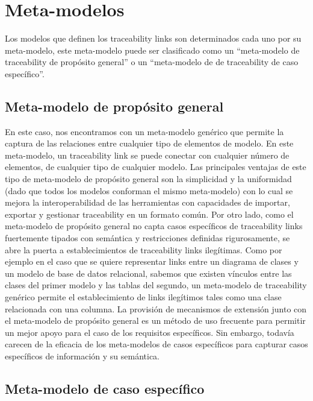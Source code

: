 \documentclass[a4paper,12pt,oneside]{book}
\begin{document}
\section{Meta-modelos}

Los modelos que definen los traceability links son determinados cada uno por su meta-modelo, este meta-modelo puede ser clasificado como un “meta-modelo de traceability de propósito general” o un “meta-modelo de de traceability de caso específico”.

\subsection{Meta-modelo de propósito general}

En este caso, nos encontramos con un meta-modelo genérico que permite la captura de las relaciones entre cualquier tipo de elementos de modelo. En este meta-modelo, un traceability link se puede conectar con cualquier número de elementos, de cualquier tipo de cualquier modelo. Las principales ventajas de este tipo de meta-modelo de propósito general son la simplicidad y la uniformidad (dado que todos los modelos conforman el mismo meta-modelo) con lo cual se mejora la interoperabilidad de las herramientas con capacidades de importar, exportar y gestionar traceability en un formato común. Por otro lado, como el meta-modelo de propósito general no capta casos específicos de traceability links fuertemente tipados con semántica y restricciones definidas rigurosamente, se abre la puerta a establecimientos de traceability links ilegítimas. Como por ejemplo en el caso que se quiere representar links entre un diagrama de clases y un modelo de base de datos relacional, sabemos que existen vínculos entre las clases del primer modelo y las tablas del segundo, un meta-modelo de traceability genérico permite el establecimiento de links ilegítimos tales como una clase relacionada con una columna. La provisión de mecanismos de extensión junto con el meta-modelo de propósito general es un método de uso frecuente para permitir un mejor apoyo para el caso de los requisitos específicos. Sin embargo, todavía carecen de la eficacia de los meta-modelos de casos específicos para capturar casos específicos de información y su semántica.

\subsection{Meta-modelo de caso específico}
\end{document}
